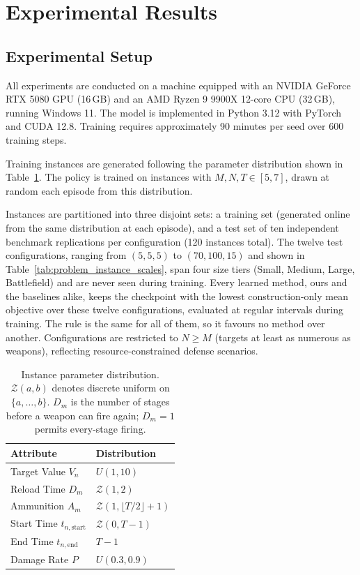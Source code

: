 \section{Experimental Results}
\label{sec:results}

\subsection{Experimental Setup}
\label{sec:data}

All experiments are conducted on a machine equipped with an NVIDIA GeForce RTX 5080 GPU (16\,GB) and an AMD Ryzen 9 9900X 12-core CPU (32\,GB), running Windows 11. The model is implemented in Python 3.12 with PyTorch and CUDA 12.8. Training requires approximately 90 minutes per seed over 600 training steps.

Training instances are generated following the parameter distribution shown in Table~\ref{tab:parameter_distributions}. The policy is trained on instances with $M, N, T \in [5,7]$, drawn at random each episode from this distribution.

Instances are partitioned into three disjoint sets: a training set (generated online from the same distribution at each episode), and a test set of ten independent benchmark replications per configuration (120 instances total). The twelve test configurations, ranging from $(5,5,5)$ to $(70,100,15)$ and shown in Table~\ref{tab:problem_instance_scales}, span four size tiers (Small, Medium, Large, Battlefield) and are never seen during training. Every learned method, ours and the baselines alike, keeps the checkpoint with the lowest construction-only mean objective over these twelve configurations, evaluated at regular intervals during training. The rule is the same for all of them, so it favours no method over another. Configurations are restricted to $N \geq M$ (targets at least as numerous as weapons), reflecting resource-constrained defense scenarios.

\begin{table}[htbp]
\centering
\small
\caption{Instance parameter distribution. $\mathcal{Z}(a,b)$ denotes discrete uniform on $\{a, \ldots, b\}$. $D_m$ is the number of stages before a weapon can fire again; $D_m=1$ permits every-stage firing.}
\label{tab:parameter_distributions}
\begin{tabular}{l|l}
\hline
\textbf{Attribute} & \textbf{Distribution} \\ \hline
Target Value $V_n$ & $U(1, 10)$ \\
Reload Time $D_m$ & $\mathcal{Z}(1, 2)$ \\
Ammunition $A_m$ & $\mathcal{Z}(1, \lfloor T/2\rfloor{+}1)$ \\
Start Time $t_{n,\text{start}}$ & $\mathcal{Z}(0, T{-}1)$ \\
End Time $t_{n,\text{end}}$ & $T{-}1$ \\
Damage Rate $P$ & $U(0.3, 0.9)$ \\ \hline
\end{tabular}
\end{table}

